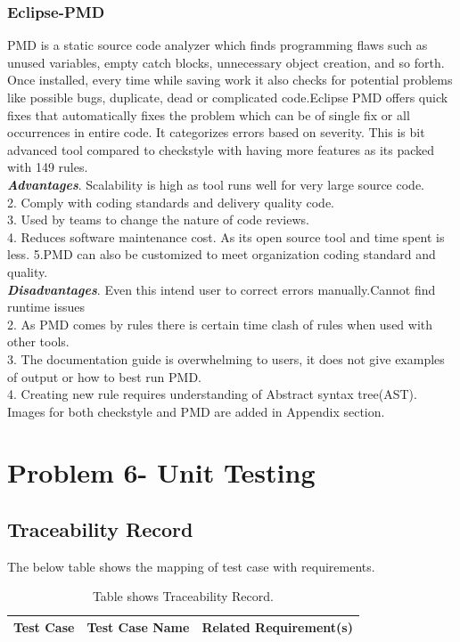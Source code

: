 \documentclass[a4paper,12pt]{article}
\begin{document}
\begin{titlepage}
\subsubsection{Eclipse-PMD}
PMD is a static source code analyzer which finds programming flaws such as unused variables, empty catch blocks, unnecessary object creation, and so forth. Once installed, every time while saving work it also checks for potential problems like possible bugs, duplicate, dead or complicated code.Eclipse PMD offers quick fixes that automatically fixes the problem which can be of single fix or all occurrences in entire code. It categorizes errors based on severity. This is bit advanced tool compared to checkstyle with having more features as its packed with 149 rules.\\
\newline
\textbf{\textit{Advantages}}. Scalability is high as tool runs well for very large source code.\\ 
2. Comply with coding standards and delivery quality code. \\
3. Used by teams to change the nature of code reviews.\\
4. Reduces software maintenance cost. As its open source tool and time spent is less.\newline
5.PMD can also be customized to meet organization coding standard and quality.\\
\newline
\textbf{\textit{Disadvantages}}. Even this intend user to correct errors manually.Cannot find runtime issues\\
2. As PMD comes by rules there is certain time clash of rules when used with other tools.\\
3. The documentation guide is overwhelming to users, it does not give examples of output or how to best run PMD. \\
4. Creating new rule requires understanding of Abstract syntax tree(AST).\\
\newline
Images for both checkstyle and PMD are added in Appendix section.

\section{Problem 6- Unit Testing}
\subsection{Traceability Record}
The below table shows the mapping of test case with requirements.
\begin{center}
\begin{longtable}{|l|l|l|}
\caption{Table shows Traceability Record.} \label{tab:long} \\
\hline \multicolumn{1}{|c|}{\textbf{Test Case}} & \multicolumn{1}{c|}{\textbf{Test Case Name}} & \multicolumn{1}{c|}{\textbf{Related Requirement(s)}} \\ \hline 
\endfirsthead


\end{longtable}
\end{center}
\end{titlepage}
\end{document}
